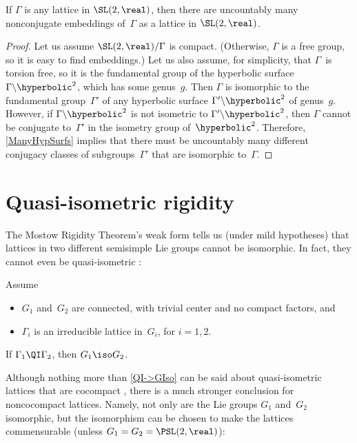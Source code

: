 \begin{cor} \label{LotsOfLattsSL2}
If\/ $\Gamma$ is any lattice in\/ $\SL(2,\real)$, then there are uncountably many nonconjugate embeddings of\/~$\Gamma$ as a lattice in\/ $\SL(2,\real)$.
\end{cor}

\begin{proof}
Let us assume $\SL(2,\real)/\Gamma$ is compact. (Otherwise, $\Gamma$ is a free group, so it is easy to find embeddings.) Let us also assume, for simplicity, that $\Gamma$~is torsion free, so it is the fundamental group of the hyperbolic surface $\Gamma \backslash \hyperbolic^2$, which has some genus~$g$. Then $\Gamma$ is isomorphic to the fundamental group~$\Gamma'$ of any hyperbolic surface $\Gamma' \backslash \hyperbolic^2$ of genus~$g$. However, if $\Gamma \backslash \hyperbolic^2$ is not isometric to $\Gamma' \backslash \hyperbolic^2$, then $\Gamma$ cannot be conjugate to~$\Gamma'$ in the isometry group of~$\hyperbolic^2$. Therefore, \cref{ManyHypSurfs} implies that there must be uncountably many different conjugacy classes of subgroups~$\Gamma'$ that are isomorphic to~$\Gamma$.
\end{proof}




\section{Quasi-isometric rigidity} \label{QIRigSect}

The Mostow Rigidity Theorem's weak form  tells us (under mild hypotheses) that lattices in two different semisimple Lie groups cannot be isomorphic. In fact, they cannot even be quasi-isometric :

\begin{thm} \label{QI->GIso}
Assume
\noprelistbreak
	\begin{itemize}
	\item $G_1$ and~$G_2$ are connected, with trivial center and no compact factors,
	and
	\item $\Gamma_i$ is an irreducible lattice in~$G_i$, for $i = 1,2$.
	\end{itemize}
If\/ $\Gamma_1 \QI \Gamma_2$, then $G_1 \iso G_2$.
\end{thm}

Although nothing more than \cref{QI->GIso} can be said about quasi-isometric lattices that are cocompact , there is a much stronger conclusion for noncocompact lattices. Namely, not only are the Lie groups $G_1$ and~$G_2$ isomorphic, but the isomorphism can be chosen to make the lattices commensurable (unless $G_1 = G_2 = \PSL(2,\real)$): 

